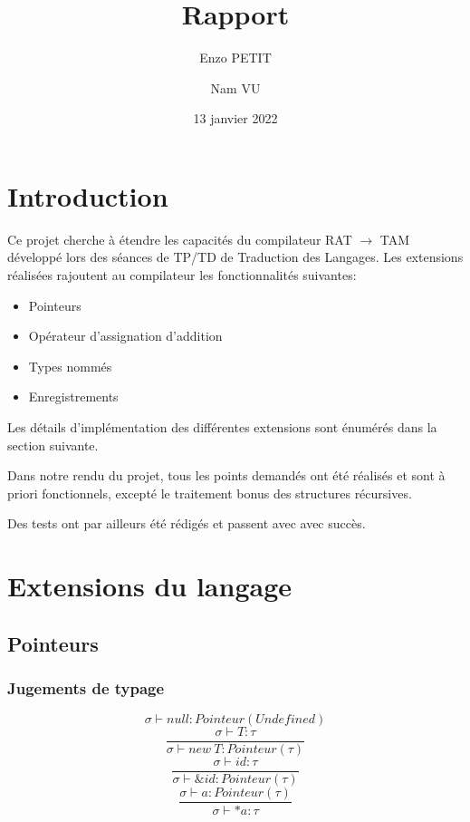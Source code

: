 \documentclass[headings=standardclasses,parskip=half]{scrartcl}
\title{Rapport}
\subtitle{}
\author{Enzo PETIT \and Nam VU}
\date{13 janvier 2022}
\begin{document}
\maketitle

\tableofcontents

\pagebreak

\section{Introduction}

Ce projet cherche à étendre les capacités du compilateur RAT \(\to\)
TAM développé lors des séances de TP/TD de Traduction des Langages.
Les extensions réalisées rajoutent au compilateur
les fonctionnalités suivantes:

\begin{itemize}
    \item Pointeurs
    \item Opérateur d'assignation d'addition
    \item Types nommés
    \item Enregistrements
\end{itemize}

Les détails d'implémentation des différentes extensions sont énumérés
dans la section suivante.

Dans notre rendu du projet, tous les points demandés ont été réalisés
et sont à priori fonctionnels, excepté le traitement bonus des structures
récursives.

Des tests ont par ailleurs été rédigés et passent avec avec succès.

\section{Extensions du langage}

\subsection{Pointeurs}

\subsubsection*{Jugements de typage}

\[\sigma \vdash null : Pointeur(Undefined)\]
\[\frac{\sigma \vdash T : \tau}{\sigma \vdash new\ T : Pointeur(\tau)}\]
\[\frac{\sigma \vdash id : \tau}{\sigma \vdash \&id : Pointeur(\tau)}\]
\[\frac{\sigma \vdash a : Pointeur(\tau)}{\sigma \vdash *a : \tau}\]
\end{document}
